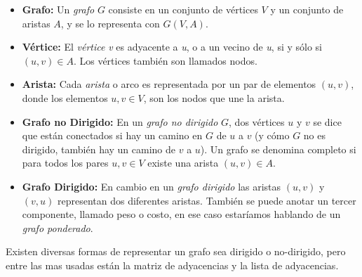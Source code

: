       \begin{itemize}
        \item \textbf{Grafo:} Un \emph{grafo} $G$ consiste en un conjunto de vértices $V$ y un conjunto de aristas $A$, y se lo representa con $G(V,A)$.

        \item  \textbf{Vértice:} El \emph{vértice} \emph{v} es adyacente a \emph{u}, o a un vecino de \emph{u}, si y sólo si $(u,v) \in A$. Los vértices también son llamados nodos.

        \item  \textbf{Arista:}
        Cada \emph{arista} o arco es representada por un par de elementos $(u,v)$, donde los elementos $u,v \in V$, son los nodos que une la arista.


        \item \textbf{Grafo no Dirigido:}
        En un \emph{grafo no dirigido} $G$, dos vértices $u$ y $v$ se dice que están conectados si hay un camino en $G$ de $u$ a $v$ (y cómo $G$ no es dirigido, también hay un camino de $v$ a $u$). Un grafo  se denomina completo si para todos los pares $u,v \in V$ existe una arista $(u,v) \in A$.


        \item \textbf{Grafo Dirigido:} En cambio en un \emph{grafo dirigido} las aristas $(u,v)$ y $(v,u)$ representan dos diferentes aristas. También se puede anotar un tercer componente, llamado peso o costo, en ese caso estaríamos hablando de un \emph{grafo ponderado}.

      \end{itemize}



      Existen diversas formas de representar un grafo sea dirigido o no-dirigido, pero entre las mas usadas están la matriz de adyacencias y la lista de adyacencias.

